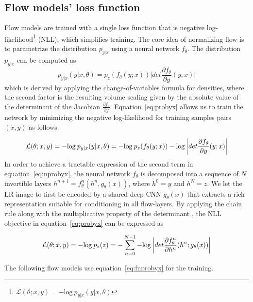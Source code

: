 \documentclass{article}
\begin{document}
\subsection{Flow models' loss function}
Flow models are trained with a single loss function that is negative log-likelihood\footnote{$\mathcal{L}(\theta; x, y) = - \text{log}\:p_{y|x}(y|x, \theta)$} (NLL), which simplifies training. The core idea of normalizing flow is to parametrize the distribution $p_{y|x}$ using a neural network $f_\theta$.  The distribution $p_{y|x}$ can be computed as
\begin{equation}
    \label{eq:probyx}
    p_{y|x}(y|x,\theta) = p_z (f_{\theta}(y;x))  \bigg | det \frac{\partial f_{\theta}}{\partial y}(y;x) \bigg |
\end{equation}
which is derived by applying the change-of-variables formula for densities, where the second factor is the resulting volume scaling given by the absolute value of the determinant of the Jacobian $\frac{\partial f_{\theta}}{\partial y}$. Equation~\ref{eq:probyx} allows us to train the network by minimizing the negative log-likelihood for training samples pairs $(x, y)$ as follows.

\begin{equation}
    \label{eq:nprobyx}
    \mathcal{L}(\theta; x,y) = -\textnormal{log} \: p_{y|x}(y|x,\theta) = -\textnormal{log} \: p_z (f_{\theta}(y;x))  -\textnormal{log} \: \bigg | det \frac{\partial f_{\theta}}{\partial y}(y;x) \bigg |
\end{equation}
In order to achieve a tractable expression of the second term in equation~\ref{eq:nprobyx}, the neural network $f_\theta$ is decomposed into a sequence of $N$ invertible layers $h^{n+1}= f^n_\theta(h^n, g_\theta(x))$, where $h^0 = y$ and $h^N = z$. We let the LR image to first be encoded by a shared deep CNN $g_{\theta}(x)$ that extracts a rich representation suitable for conditioning in all flow-layers. By applying the chain rule along with the multiplicative property of the determinant \cite{dens}, the NLL objective in equation~\ref{eq:probyx} can be expressed as

\begin{equation}
    \label{eq:fnprobyx}
    \mathcal{L}(\theta; x,y) = -\textnormal{log} \: p_{z}(z) = -\sum^{N-1}_{n=0}   -\textnormal{log} \: \bigg | det \frac{\partial f_{\theta}^n}{\partial h^n}(h^n;g_\theta(x)) \bigg |
\end{equation}

\noindent The following flow models use equation~\ref{eq:fnprobyx} for the training.
\end{document}
